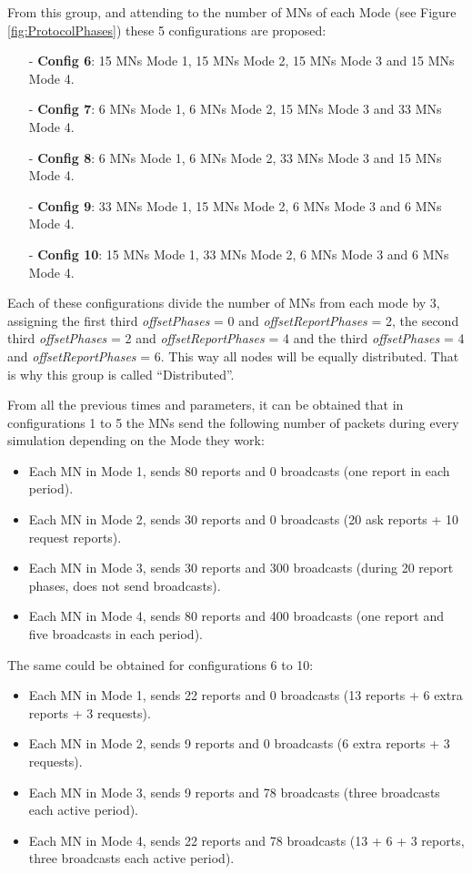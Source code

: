 \begin{itemize}
From this group, and attending to the number of \acp{MN} of each Mode (see Figure \ref{fig:ProtocolPhases}) these 5 configurations are proposed:
\begin{itemize}
 \item[-] \textbf{Config 6}: 15 \acp{MN} Mode 1, 15 \acp{MN} Mode 2, 15 \acp{MN} Mode 3 and 15 \acp{MN} Mode 4.
 \item[-] \textbf{Config 7}: 6 \acp{MN} Mode 1, 6 \acp{MN} Mode 2, 15 \acp{MN} Mode 3 and 33 \acp{MN} Mode 4.
 \item[-] \textbf{Config 8}: 6 \acp{MN} Mode 1, 6 \acp{MN} Mode 2, 33 \acp{MN} Mode 3 and 15 \acp{MN} Mode 4.
 \item[-] \textbf{Config 9}: 33 \acp{MN} Mode 1, 15 \acp{MN} Mode 2, 6 \acp{MN} Mode 3 and 6 \acp{MN} Mode 4.
 \item[-] \textbf{Config 10}: 15 \acp{MN} Mode 1, 33 \acp{MN} Mode 2, 6 \acp{MN} Mode 3 and 6 \acp{MN} Mode 4.
\end{itemize}
Each of these configurations divide the number of \acp{MN} from each mode by 3, assigning the first third \textit{offsetPhases} = 0 and 
\textit{offsetReportPhases} = 2, the second third \textit{offsetPhases} = 2 and \textit{offsetReportPhases} = 4 and the third
\textit{offsetPhases} = 4 and \textit{offsetReportPhases} = 6. This way all nodes will be equally distributed. That is why this group is called
``Distributed''. 
\end{itemize}

From all the previous times and parameters, it can be obtained that in configurations 1 to 5 the \acp{MN} send the following number of packets during
every simulation depending on the Mode they work:
\begin{itemize}
 \item Each \ac{MN} in Mode 1, sends 80 reports and 0 broadcasts (one report in each period).
 \item Each \ac{MN} in Mode 2, sends 30 reports and 0 broadcasts (20 ask reports + 10 request reports).
 \item Each \ac{MN} in Mode 3, sends 30 reports and 300 broadcasts (during 20 report phases, does not send broadcasts).
 \item Each \ac{MN} in Mode 4, sends 80 reports and 400 broadcasts (one report and five broadcasts in each period).
\end{itemize}
The same could be obtained for configurations 6 to 10:
\begin{itemize}
 \item Each \ac{MN} in Mode 1, sends 22 reports and 0 broadcasts (13 reports + 6 extra reports + 3 requests).
 \item Each \ac{MN} in Mode 2, sends 9 reports and 0 broadcasts (6 extra reports + 3 requests).
 \item Each \ac{MN} in Mode 3, sends 9 reports and 78 broadcasts (three broadcasts each active period).
 \item Each \ac{MN} in Mode 4, sends 22 reports and 78 broadcasts (13 + 6 + 3 reports, three broadcasts each active period).
\end{itemize}

